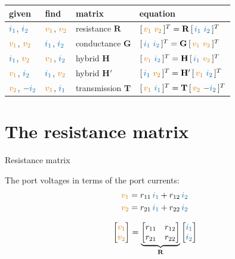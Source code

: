 \documentclass[11pt,a4paper]{article}
\newcommand{\Icol}[1]{\textcolor{ccur}{#1}}
\newcommand{\Vcol}[1]{\textcolor{cvolt}{#1}}
\newcommand{\vone}{\Vcol{v_1}}  \newcommand{\vtwo}{\Vcol{v_2}}
\newcommand{\ione}{\Icol{i_1}}  \newcommand{\itwo}{\Icol{i_2}}
\newcommand{\Rm}{\mathbf{R}}  \newcommand{\Gm}{\mathbf{G}}
\newcommand{\Hm}{\mathbf{H}}  \newcommand{\Tm}{\mathbf{T}}
\begin{document}
\begin{center}
\small
\renewcommand{\arraystretch}{1.25}
\begin{tabular}{@{}llll@{}}
\toprule
\textbf{given} & \textbf{find} & \textbf{matrix} & \textbf{equation}\\
\midrule
$\ione$, $\itwo$ & $\vone$, $\vtwo$ & resistance $\Rm$ & $[\,\vone \ \vtwo\,]^T = \Rm\,[\,\ione \ \itwo\,]^T$\\
$\vone$, $\vtwo$ & $\ione$, $\itwo$ & conductance $\Gm$ & $[\,\ione \ \itwo\,]^T = \Gm\,[\,\vone \ \vtwo\,]^T$\\
$\ione$, $\vtwo$ & $\vone$, $\itwo$ & hybrid $\Hm$ & $[\,\vone \ \itwo\,]^T = \Hm\,[\,\ione \ \vtwo\,]^T$\\
$\vone$, $\itwo$ & $\ione$, $\vtwo$ & hybrid $\Hm'$ & $[\,\ione \ \vtwo\,]^T = \Hm'\,[\,\vone \ \itwo\,]^T$\\
$\vtwo$, $-\itwo$ & $\vone$, $\ione$ & transmission $\Tm$ & $[\,\vone \ \ione\,]^T = \Tm\,[\,\vtwo \ {-\itwo}\,]^T$\\
\bottomrule
\end{tabular}
\end{center}

\section{The resistance matrix}

\begin{definitionbox}{Resistance matrix}
\begin{minipage}[c]{0.5\linewidth}
The port voltages in terms of the port currents:
\[
  \begin{aligned}
    \vone &= r_{11}\,\ione + r_{12}\,\itwo\\
    \vtwo &= r_{21}\,\ione + r_{22}\,\itwo
  \end{aligned}
\]
\end{minipage}\hfill
\begin{minipage}[c]{0.46\linewidth}
\[
  \begin{bmatrix} \vone\\ \vtwo \end{bmatrix}
  = \underbrace{\begin{bmatrix} r_{11} & r_{12}\\ r_{21} & r_{22} \end{bmatrix}}_{\Rm}
    \begin{bmatrix} \ione\\ \itwo \end{bmatrix}
\]
\end{minipage}
\end{definitionbox}
\end{document}
